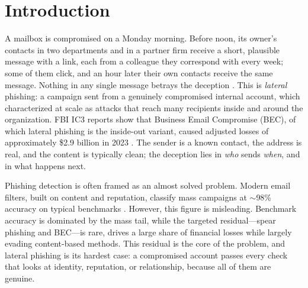 \section{Introduction}
\label{sec:intro}

A mailbox is compromised on a Monday morning. Before noon, its owner's contacts in two departments and in a partner firm receive a short, plausible message with a link, each from a colleague they correspond with every week; some of them click, and an hour later their own contacts receive the same message. Nothing in any single message betrays the deception \citep{butavicius2022why,sturman2025security}. This is \emph{lateral} phishing: a campaign sent from a genuinely compromised internal account, which \citet{ho2019detecting} characterized at scale as attacks that reach many recipients inside and around the organization. FBI IC3 reports show that Business Email Compromise (BEC), of which lateral phishing is the inside-out variant, caused adjusted losses of approximately \$2.9 billion in 2023 \citep{fbi2024ic3}. The sender is a known contact, the address is real, and the content is typically clean; the deception lies in \emph{who} sends \emph{when}, and in what happens next.

Phishing detection is often framed as an almost solved problem. Modern email filters, built on content and
reputation, classify mass campaigns at $\sim$98\% accuracy on typical benchmarks
\citep{birthriya2025detection,tan2020graph}. However, this figure is misleading. Benchmark accuracy is
dominated by the mass tail, while the targeted residual---spear phishing and BEC---is rare, drives a large share of financial losses
\citep{cidon2019high,ho2019detecting} while largely evading content-based methods. This residual is
the core of the problem, and lateral phishing is its hardest case: a compromised account passes every check
that looks at identity, reputation, or relationship, because all of them are genuine.

